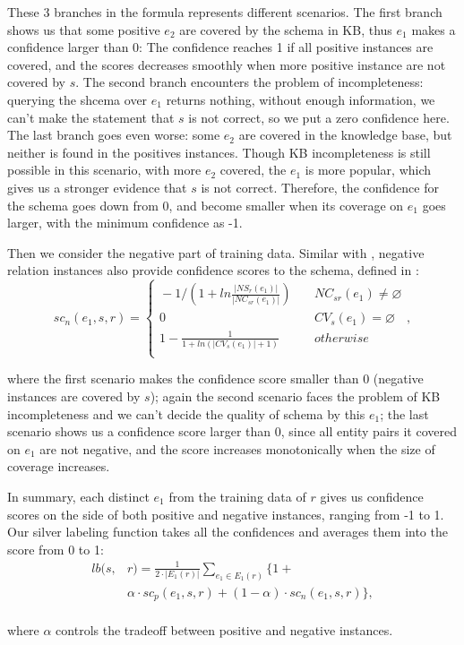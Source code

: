 These 3 branches in the formula represents different scenarios.
The first branch shows us that some positive $e_2$ are covered by 
the schema in KB, thus $e_1$ makes a confidence larger than 0:
The confidence reaches 1 if all positive instances are covered, 
and the scores decreases smoothly when more positive instance are
not covered by $s$.
The second branch encounters the problem of incompleteness: 
querying the shcema over $e_1$ returns nothing, without enough 
information, we can't make the statement that $s$ is not correct,
so we put a zero confidence here.
The last branch goes even worse: some $e_2$ are covered in the 
knowledge base, but neither is found in the positives instances.
Though KB incompleteness is still possible in this scenario, 
with more $e_2$ covered, the $e_1$ is more popular, which 
gives us a stronger evidence that $s$ is not correct.
Therefore, the confidence for the schema goes down from 0,
and become smaller when its coverage on $e_1$ goes larger, with
the minimum confidence as -1.

Then we consider the negative part of training data.
Similar with , negative relation instances also
provide confidence scores to the schema, 
defined in :
\begin{equation}
\label{eqn:scn}
  sc_n(e_1, \! s, \! r) \! = \! \left\{
    \begin{aligned}
	\! -1 / ( 1 \! + \! ln \frac
	  {\left| NS_r(e_1) \right|}
	  {\left| NC_{sr}(e_1) \right|}
	)            & ~ & NC_{sr}(e_1) \! \neq \! \varnothing  \\
	\! 0         & ~ & CV_s(e_1) \! = \! \varnothing        \\
	\! 1 \! - \! \frac {1} {
	  1 \! + \! ln (\left| CV_s(e_1) \right| \! + \! 1)
	}            & ~ & otherwise \\
	\end{aligned}
  \right.,
\end{equation}

\noindent
where the first scenario makes the confidence score smaller than 0
(negative instances are covered by $s$); again the second scenario
faces the problem of KB incompleteness and we can't decide the 
quality of schema by this $e_1$; the last scenario shows us a
confidence score larger than 0, since all entity pairs it covered 
on $e_1$ are not negative, and the score increases monotonically 
when the size of coverage increases.

In summary, each distinct $e_1$ from the training data of $r$ gives
us confidence scores on the side of both positive and negative
instances, ranging from -1 to 1.
Our silver labeling function takes all the confidences and 
averages them into the score from 0 to 1:
\begin{equation}
\begin{aligned}
  lb(s, & r) = 
  \frac {1} {2 \cdot \left| E_1(r) \right|}
  \sum\limits_{e_1 \in E_1(r)} \{ 
    1 + \\
	& \alpha \cdot sc_p(e_1, s, r) 
	+ (1 - \alpha) \cdot sc_n(e_1, s, r)
  \},  \\
\end{aligned}
\end{equation}

\noindent
where $\alpha$ controls the tradeoff between positive and negative
instances.

